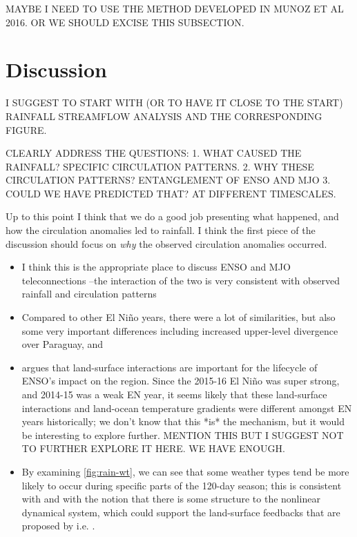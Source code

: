 \documentclass[twocol]{ametsoc}
\begin{document}
MAYBE I NEED TO USE THE METHOD DEVELOPED IN MUNOZ ET AL 2016. OR WE SHOULD EXCISE THIS SUBSECTION.

\section{Discussion}
\label{sec:discussion}

I SUGGEST TO START WITH (OR TO HAVE IT CLOSE TO THE START) RAINFALL STREAMFLOW ANALYSIS AND THE CORRESPONDING FIGURE.

CLEARLY ADDRESS THE QUESTIONS:
1. WHAT CAUSED THE RAINFALL? SPECIFIC CIRCULATION PATTERNS.
2. WHY THESE CIRCULATION PATTERNS? ENTANGLEMENT OF ENSO AND MJO
3. COULD WE HAVE PREDICTED THAT? AT DIFFERENT TIMESCALES.

Up to this point I think that we do a good job presenting what happened, and how the circulation anomalies led to rainfall.
I think the first piece of the discussion should focus on \emph{why} the observed circulation anomalies occurred.
\begin{itemize}
	\item I think this is the appropriate place to discuss ENSO and MJO teleconnections --the interaction of the two is very consistent with observed rainfall and circulation patterns
	\item Compared to other El Ni\~{n}o years, there were a lot of similarities, but also some very important differences including increased upper-level divergence over Paraguay, and
	\item \citet{Grimm2009} argues that land-surface interactions are important for the lifecycle of ENSO's impact on the region.
	Since the 2015-16 El Ni\~no was super strong, and 2014-15 was a weak EN year, it seems likely that these land-surface interactions and land-ocean temperature gradients were different amongst EN years historically; we don't know that this *is* the mechanism, but it would be interesting to explore further. MENTION THIS BUT I SUGGEST NOT TO FURTHER EXPLORE IT HERE. WE HAVE ENOUGH.
	\item By examining \cref{fig:rain-wt}, we can see that some weather types tend be more likely to occur during specific parts of the 120-day season; this is consistent with \citet{Munoz2016} and with the notion that there is some structure to the nonlinear dynamical system, which could support the land-surface feedbacks that are proposed by i.e. \citep{Grimm:2009bq}.
\end{itemize}
\end{document}
